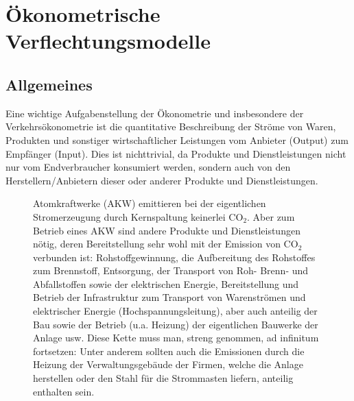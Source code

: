 


\chapter{\label{sec:IOM}\label{sec:verfl}\"Okonometrische
  Verflechtungsmodelle}


\section{Allgemeines}

Eine wichtige Aufgabenstellung der \"Okonometrie und insbesondere der
Verkehrs\"okono\-me\-trie ist die quantitative Beschreibung der
Str\"ome von Waren, Produkten und sonstiger wirtschaftlicher
Leistungen vom Anbieter (Output) zum Empf\"anger (Input).
Dies ist nichttrivial, da 
Produkte und Dienstleistungen
nicht nur vom Endverbraucher konsumiert werden, sondern auch von den
Herstellern/Anbietern  dieser oder anderer Produkte und Dienstleistungen. 


\begin{figure}
\caption{\label{fig:AKW}
Atomkraftwerke (AKW) emittieren bei der eigentlichen
Stromerzeugung durch Kernspaltung keinerlei CO$_2$. Aber zum Betrieb
eines AKW sind andere Produkte und Dienstleistungen n\"otig, deren
Bereitstellung  sehr
wohl mit der Emission von CO$_2$ verbunden ist: Rohstoffgewinnung, die
Aufbereitung des Rohstoffes zum Brennstoff, Entsorgung, der Transport
von Roh- Brenn- und Abfallstoffen sowie der elektrischen Energie, Bereitstellung und Betrieb der
Infrastruktur zum Transport von Warenstr\"omen und elektrischer
Energie (Hochspannungsleitung), aber auch anteilig der Bau sowie der Betrieb (u.a. Heizung)
der eigentlichen Bauwerke der Anlage usw. Diese 
Kette muss man, streng genommen, ad infinitum fortsetzen: Unter
anderem sollten auch die Emissionen durch die Heizung der
Verwaltungsgeb\"aude der Firmen, welche die Anlage herstellen oder den
Stahl f\"ur die Strommasten liefern, anteilig enthalten sein.
}
\end{figure}

